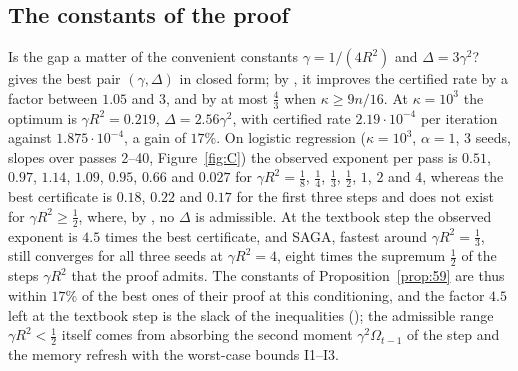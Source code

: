 \subsection{The constants of the proof}\label{sec:exp-constants}

Is the gap a matter of the convenient constants $\gamma=1/(4R^2)$ and $\Delta=3\gamma^2$?  gives
the best pair $(\gamma,\Delta)$ in closed form; by , it improves the certified rate by a factor
between $1.05$ and $3$, and by at most $\frac43$ when $\kappa\ge9n/16$. At $\kappa=10^3$ the
optimum is $\gamma R^2=0.219$, $\Delta=2.56\gamma^2$, with certified rate $2.19\cdot10^{-4}$ per iteration against
$1.875\cdot10^{-4}$, a gain of $17\%$. On logistic regression ($\kappa=10^3$, $\alpha=1$, 3 seeds, slopes over passes 2--40,
Figure~\ref{fig:C}) the observed exponent per pass is $0.51$, $0.97$, $1.14$, $1.09$, $0.95$, $0.66$ and $0.027$ for
$\gamma R^2=\frac18$, $\frac14$, $\frac13$, $\frac12$, $1$, $2$ and $4$, whereas the best certificate is $0.18$, $0.22$ and $0.17$
for the first three steps and does not exist for $\gamma R^2\ge\frac12$, where, by , no $\Delta$ is
admissible. At the textbook step the observed exponent is $4.5$ times the best certificate, and SAGA,
fastest around $\gamma R^2=\frac13$, still converges for all three seeds at $\gamma R^2=4$, eight times the supremum
$\frac12$ of the steps $\gamma R^2$ that the proof admits. The constants of Proposition~\ref{prop:59} are thus within $17\%$
of the best ones of their proof at this conditioning, and the factor $4.5$ left at the textbook step is the slack of the
inequalities (); the admissible range $\gamma R^2<\frac12$ itself comes from absorbing the
second moment $\gamma^2\Omega_{t-1}$ of the step and the memory refresh with the worst-case bounds I1--I3.

